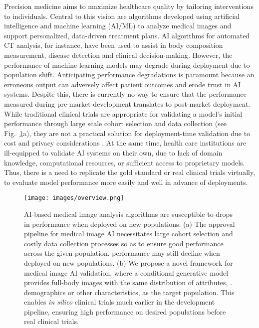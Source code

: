 Precision medicine aims to maximize healthcare quality by tailoring interventions to individuals.\cite{kosorok2019precision} %
Central to this vision are algorithms developed using artificial intelligence and machine learning (AI/ML) to analyze medical images and support personalized, data-driven treatment plans. AI algorithms for automated CT analysis, for instance, have been used to assist in body composition measurement,\cite{zopfs2020evaluating} disease detection\cite{pickhardt2013opportunistic, jang2019opportunistic,eng2021automated, oh2024evaluation} and clinical decision-making.\cite{ozsahin2020review, murugesan2022a, mohammadi2024deep}
However, the performance of machine learning models may degrade during deployment due to population shift.\cite{oakden2020hidden, compton2023when, william2022external}
Anticipating performance degradations is paramount because an erroneous output can adversely affect patient outcomes and erode trust in AI systems.\cite{topol2019high}
Despite this, there is currently no way to ensure that the performance measured during pre-market development translates to post-market deployment.
While traditional clinical trials are appropriate for validating a model's initial performance through large scale cohort selection and data collection (see Fig.~\ref{fig:overview}a), they are not a practical solution for deployment-time validation due to cost and privacy considerations \cite{rajpurkar2022ai, menard2024artificial}.
At the same time, health care institutions are ill-equipped to validate AI systems on their own, due to lack of domain knowledge, computational resources, or sufficient access to proprietary models.
Thus, there is a need to replicate the gold standard or real clinical trials virtually, to evaluate model performance more easily and well in advance of deployments.

\begin{figure}[t]
    \centering
    \texttt{[image: images/overview.png]}
    \caption{AI-based medical image analysis algorithms are susceptible to drops in performance when deployed on new populations. (a) The approval pipeline for medical image AI necessitates large cohort selection and costly data collection processes so as to ensure good performance across the given population. performance may still decline when deployed on new populations.\cite{oakden2020hidden}
      (b) We propose a novel framework for medical image AI validation, where a conditional generative model provides full-body images with the same distribution of attributes, \ie. demographics or other characteristics, as the target population. This enables \emph{in silico} clinical trials much earlier in the development pipeline, ensuring high performance on desired populations before real clinical trials.
      }
    \label{fig:overview}
\end{figure}

